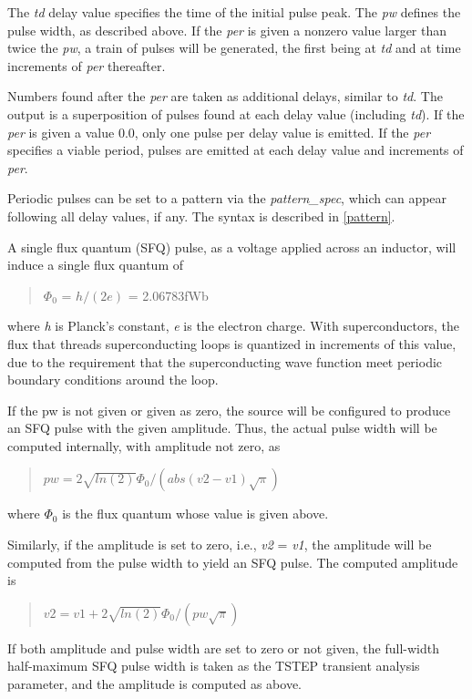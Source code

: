 The {\it td} delay value specifies the time of the initial pulse peak. 
The {\it pw} defines the pulse width, as described above.  If the {\it
per} is given a nonzero value larger than twice the {\it pw}, a train
of pulses will be generated, the first being at {\it td} and at time
increments of {\it per} thereafter.

Numbers found after the {\it per} are taken as additional delays,
similar to {\it td\/}.  The output is a superposition of pulses found
at each delay value (including {\it td\/}).  If the {\it per} is given
a value 0.0, only one pulse per delay value is emitted.  If the {\it
per} specifies a viable period, pulses are emitted at each delay value
and increments of {\it per\/}.

Periodic pulses can be set to a pattern via the {\it pattern\_spec},
which can appear following all delay values, if any.  The syntax is
described in \ref{pattern}.

A single flux quantum (SFQ) pulse, as a voltage applied across an
inductor, will induce a single flux quantum of
\begin{quote}
 $\Phi_0$ = $h/(2e)$ = 2.06783fWb
\end{quote}
where {\it h} is Planck's constant, {\it e} is the electron charge. 
With superconductors, the flux that threads superconducting loops is
quantized in increments of this value, due to the requirement that the
superconducting wave function meet periodic boundary conditions around
the loop.

If the {\vt pw} is not given or given as zero, the source will be
configured to produce an SFQ pulse with the given amplitude.  Thus,
the actual pulse width will be computed internally, with amplitude not
zero, as
\begin{quote}
$pw = 2\sqrt{ln(2)}\Phi_0/(abs(v2-v1)\sqrt\pi)$
\end{quote}
where $\Phi_0$ is the flux quantum whose value is given above.

Similarly, if the amplitude is set to zero, i.e., {\it v2} = {\it
v1\/}, the amplitude will be computed from the pulse width to yield an
SFQ pulse.  The computed amplitude is
\begin{quote}
$v2 = v1 + 2\sqrt{ln(2)}\Phi_0/(pw\sqrt\pi)$
\end{quote}

If both amplitude and pulse width are set to zero or not given, the
full-width half-maximum SFQ pulse width is taken as the TSTEP
transient analysis parameter, and the amplitude is computed as above.

